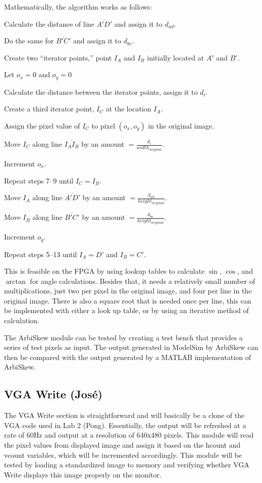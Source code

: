 \documentclass[10pt]{article}
\begin{document}
Mathematically, the algorithm works as follows:
\begin{enumerate*}
\item Calculate the distance of line $\overline{A\prime D\prime}$ and assign it to $d_{ad}$.
\item Do the same for $\overline{B\prime C\prime}$ and assign it to $d_{bc}$.
\item Create two ``iterator points,'' point $I_A$ and $I_B$ initially located at $A\prime$ and $B\prime$.
\item Let $o_x = 0$ and $o_y = 0$
\item Calculate the distance between the iterator points, assign it to $d_i$.
\item Create a third iterator point, $I_C$ at the location $I_A$.
\item Assign the pixel value of $I_C$ to pixel $(o_x, o_y)$ in the original image.
\item Move $I_C$ along line $\overline{I_A I_B}$ by an amount $= \frac{d_i}{width_{original}}$.
\item Increment $o_x$.
\item Repeat steps 7--9 until $I_C = I_B$.
\item Move $I_A$ along line $\overline{A\prime D\prime}$ by an amount $= \frac{d_{ad}}{height_{original}}$.
\item Move $I_B$ along line $\overline{B\prime C\prime}$ by an amount $= \frac{d_{bc}}{height_{original}}$.
\item Increment $o_y$.
\item Repeat steps 5--13 until $I_A = D\prime$ and $I_B = C\prime$.
\end{enumerate*}

This is feasible on the FPGA by using lookup tables to calculate $\sin$, $\cos$, and $\arctan$ for angle calculations. Besides that, it needs a relatively small number of multiplications, just two per pixel in the original image, and four per line in the original image. There is also a square root that is needed once per line, this can be implemented with either a look up table, or by using an iterative method of calculation.

The ArbiSkew module can be tested by creating a test bench that provides a series of test pixels as input. The output generated in ModelSim by ArbiSkew can then be compared with the output generated by a MATLAB implementation of ArbiSkew.

\subsection{VGA Write (Jos\'{e})}
The VGA Write section is straightforward and will basically be a clone of the VGA code used in Lab 2 (Pong). Essentially, the output will be refreshed at a rate of 60Hz and output at a resolution of 640x480 pixels. This module will read the pixel values from displayed image and assign it based on the hcount and vcount variables, which will be incremented accordingly. This module will be tested by loading a standardized image to memory and verifying whether VGA Write displays this image properly on the monitor.
\end{document}
